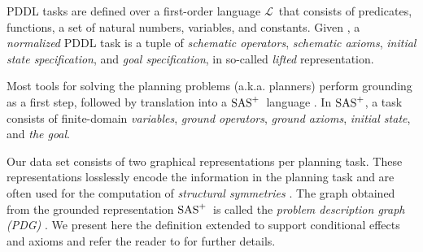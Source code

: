 \documentclass{article}
\begin{document}
\newcommand{\sasp}{\ensuremath{\textup{SAS}^+{}}}

\newcommand{\lang}{\ensuremath{\mathcal L}}
\newcommand{\ops}{\ensuremath{\mathcal O}}
\newcommand{\axs}{\ensuremath{\mathcal A}}
\newcommand{\cost}{\ensuremath{\textit{cost}}}
\newcommand{\pre}{\ensuremath{\textit{pre}}}
\newcommand{\cond}{\ensuremath{\textit{cond}}}
\newcommand{\eff}{\ensuremath{\textit{eff}}}
\newcommand{\body}{\ensuremath{\textit{body}}}
\newcommand{\head}{\ensuremath{\textit{head}}}
\newcommand{\derived}[1]{\ensuremath{\llbracket#1\rrbracket}}
\newcommand{\init}{\ensuremath{s_0}}
\newcommand{\goal}{\ensuremath{s_\star}}
\newcommand{\variables}{\ensuremath{\mathcal V}}
\newcommand{\dvariables}{\ensuremath{\mathcal V}_{d}}
\newcommand{\dvalues}{\ensuremath{s_d}}
\newcommand{\dom}{\ensuremath{\textit{dom}}}
\newcommand{\vars}{\ensuremath{\textit{vars}}}
\newcommand{\effs}{\ensuremath{\textit{effs}}}
\newcommand{\var}{\ensuremath{\textit{var}}}
\newcommand{\val}{\ensuremath{\textit{val}}}
\newcommand{\inlinecite}[1]{\citeauthor{#1} \citeyear{#1}}
\newcommand{\rawcite}[1]{\citeauthor{#1}, \citeyear{#1}}

\newcommand{\as}{\ensuremath{A}}
\newcommand{\symmetrygraph}{\ensuremath{\textit{ASG}}}

\newtheorem{definition}{Definition}

PDDL tasks are defined over a first-order language \lang\ that consists of
predicates, functions, a set of natural numbers, variables, and constants. Given
, a \emph{normalized} \cite{helmert-aij2009} PDDL task is a tuple  of \emph{schematic operators}, \emph{schematic
axioms}, \emph{initial state specification}, and \emph{goal specification}, in
so-called \emph{lifted} representation.

Most tools for solving the planning problems (a.k.a. planners) perform grounding as
a first step, followed by translation into a \sasp\ language
\cite{backstrom-nebel-compint1995}. In \sasp, a task  consists of finite-domain \emph{variables},
\emph{ground operators}, \emph{ground axioms}, \emph{initial state}, and
\emph{the goal}.

Our data set consists of two graphical representations per planning task. These
representations losslessly encode the information in the planning task and are
often used for the computation of \emph{structural symmetries}
\cite{shleyfman-et-al-aaai2015}. The graph obtained from the grounded
representation \sasp\ is called the \emph{problem description graph (PDG)}
\cite{pochter-et-al-aaai2011}. We present here the definition extended to
support conditional effects and axioms and refer the reader to
\citet{sievers-et-al-aaai2019} for further details. 
\end{document}

